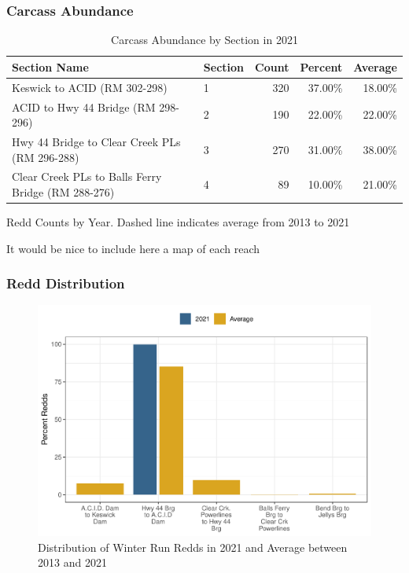 \documentclass[
]{book}
\theoremstyle{definition}
\theoremstyle{definition}
\theoremstyle{definition}
\theoremstyle{definition}
\theoremstyle{remark}
\begin{document}
\hypertarget{carcass-abundance}{%
\subsubsection{Carcass Abundance}\label{carcass-abundance}}

\begin{table}
\centering
\caption{Carcass Abundance by Section in 2021}
\centering
\begin{tabular}[t]{llrrr}
\hline
Section Name & Section & Count & Percent & Average\\
\hline
Keswick to ACID (RM 302-298) & 1 & 320 & 37.00\% & 18.00\%\\
\hline
ACID to Hwy 44 Bridge (RM 298-296) & 2 & 190 & 22.00\% & 22.00\%\\
\hline
Hwy 44 Bridge to Clear Creek PLs (RM 296-288) & 3 & 270 & 31.00\% & 38.00\%\\
\hline
Clear Creek PLs to Balls Ferry Bridge (RM 288-276) & 4 & 89 & 10.00\% & 21.00\%\\
\hline
\end{tabular}
\end{table}

\label{fig:redds-fig}Redd Counts by Year. Dashed line indicates average from 2013 to 2021

It would be nice to include here a map of each reach

\hypertarget{redd-distribution}{%
\subsubsection{Redd Distribution}\label{redd-distribution}}

\begin{figure}
\centering
\includegraphics{_main_files/figure-latex/redddistrib-fig-1.pdf}
\caption{\label{fig:redddistrib-fig}Distribution of Winter Run Redds in 2021 and Average between 2013 and 2021}
\end{figure}
\end{document}
